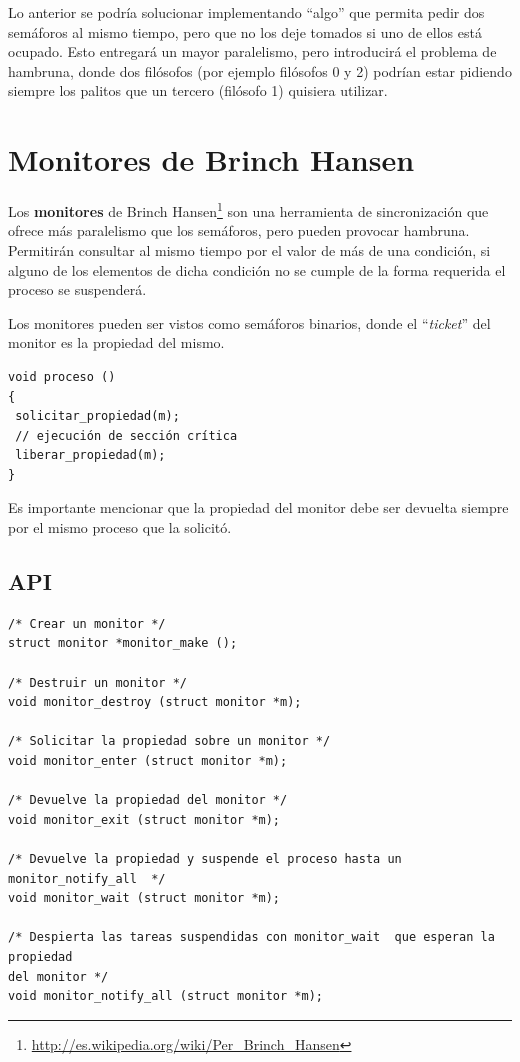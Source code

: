 Lo anterior se podría solucionar implementando ``algo'' que permita pedir dos
semáforos al mismo tiempo, pero que no los deje tomados si uno de ellos está
ocupado. Esto entregará un mayor paralelismo, pero introducirá el problema de
hambruna, donde dos filósofos (por ejemplo filósofos 0 y 2) podrían estar
pidiendo siempre los palitos que un tercero (filósofo 1) quisiera utilizar.

\section{Monitores de Brinch Hansen}
Los \textbf{monitores} de Brinch
Hansen\footnote{\url{http://es.wikipedia.org/wiki/Per_Brinch_Hansen}} son una
herramienta de sincronización que ofrece más paralelismo que los semáforos, pero
pueden provocar hambruna. Permitirán consultar al mismo tiempo por el valor de
más de una condición, si alguno de los elementos de dicha condición no se cumple
de la forma requerida el proceso se suspenderá.

Los monitores pueden ser vistos como semáforos binarios, donde el
``\emph{ticket}'' del monitor es la propiedad del mismo.

\begin{lstlisting}
void proceso ()
{
 solicitar_propiedad(m);
 // ejecución de sección crítica
 liberar_propiedad(m);
}
\end{lstlisting}

Es importante mencionar que la propiedad del monitor debe ser devuelta siempre
por el mismo proceso que la solicitó.

\subsection{API}

\begin{lstlisting}
/* Crear un monitor */
struct monitor *monitor_make ();

/* Destruir un monitor */
void monitor_destroy (struct monitor *m);

/* Solicitar la propiedad sobre un monitor */
void monitor_enter (struct monitor *m);

/* Devuelve la propiedad del monitor */
void monitor_exit (struct monitor *m);

/* Devuelve la propiedad y suspende el proceso hasta un monitor_notify_all  */
void monitor_wait (struct monitor *m);

/* Despierta las tareas suspendidas con monitor_wait  que esperan la propiedad
del monitor */
void monitor_notify_all (struct monitor *m);
\end{lstlisting}

